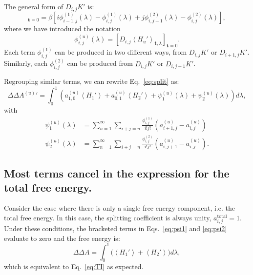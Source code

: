 \documentclass{article}
\let\vec\mathbf
\begin{document}
The general form of $D_{i,j}K'$ is:
\begin{equation}
[D_{i,j}K_\lambda']_{\vec t=0} =
	\beta\left[
		i \phi_{i-1, j}^{(1)}(\lambda) -
    	\phi_{i,j}^{(1)}(\lambda) +
    	j \phi_{i, j-1}^{(2)}(\lambda) -
    	\phi_{i,j}^{(2)}(\lambda)
    \right],
\label{eq:deriv}
\end{equation}
where we have introduced the notation
\begin{equation}
\phi_{i,j}^{(u)}(\lambda) =
	\left[ D_{i,j} \left\langle
    	H_u'
    \right\rangle_{\vec t, \lambda} \right]_{\vec t=0}.
\end{equation}
Each term $\phi_{i,j}^{(1)}$ can be produced in two different ways, from $D_{i,j}K'$ or $D_{i+1,j}K'$. Similarly, each $\phi_{i,j}^{(2)}$ can be produced from $D_{i,j}K'$ or $D_{i,j+1}K'$.

Regrouping similar terms, we can rewrite Eq.~\ref{eq:split} as:
\begin{equation}
\Delta\Delta {A^{(u)}}' =
	\int_0^1 \left(
        a_{1,0}^{(u)}\left\langle H_1' \right\rangle +
        a_{0,1}^{(u)}\left\langle H_2' \right\rangle +
        \psi_1^{(u)}(\lambda) +
        \psi_2^{(u)}(\lambda)
    \right) d\lambda,
\label{eq:dA_expansion}
\end{equation}
with
\begin{align}
\psi_1^{(u)}(\lambda) &=
	\sum_{n=1}^{\infty}
    \sum_{i+j=n}
        \frac{\phi_{i,j}^{(1)}}{i!j!}
        \left(
            {a_{i+1,j}^{(u)}} -
            {a_{i,j}^{(u)}}
        \right) \label{eq:psi1}\\
\psi_2^{(u)}(\lambda) &=
	\sum_{n=1}^{\infty}
    \sum_{i+j=n}
        \frac{\phi_{i,j}^{(2)}}{i!j!}
        \left(
            a_{i,j+1}^{(u)} -
            a_{i,j}^{(u)}
      	\right)\label{eq:psi2}.
\end{align}



\subsection{Most terms cancel in the expression for the total free energy.}

Consider the case where there is only a single free energy component, i.e. the total free energy. In this case, the splitting coefficient is always unity, $a_{i,j}^\mathrm{total}=1$. Under these conditions, the bracketed terms in Eqs.~\ref{eq:psi1} and \ref{eq:psi2} evaluate to zero and the free energy is:
\begin{equation}
\Delta\Delta A = \int_0^1 \bigg(
	\left\langle H_1' \right\rangle +
    \left\langle H_2' \right\rangle
\bigg) d\lambda,
\end{equation}
which is equivalent to Eq.~\ref{eq:TI} as expected.
\end{document}
